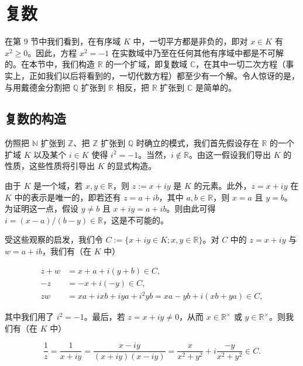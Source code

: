 \section{复数}

在第 9 节中我们看到，在有序域 $K$ 中，一切平方都是非负的，即对 $x \in K$ 有 $x^2 \geq 0$。因此，方程 $x^2 = -1$ 在实数域中乃至在任何其他有序域中都是不可解的。在本节中，我们构造 $\mathbb{R}$ 的一个扩域，即复数域 $\mathbb{C}$，在其中一切二次方程（事实上，正如我们以后将看到的，一切代数方程）都至少有一个解。令人惊讶的是，与用戴德金分割把 $\mathbb{Q}$ 扩张到 $\mathbb{R}$ 相反，把 $\mathbb{R}$ 扩张到 $\mathbb{C}$ 是简单的。

\subsection*{复数的构造}

仿照把 $ \mathbb{N} $ 扩张到 $ \mathbb{Z} $、把 $ \mathbb{Z} $ 扩张到 $ \mathbb{Q} $ 时确立的模式，我们首先假设存在 $ \mathbb{R} $ 的一个扩域 $ K $ 以及某个 $ i \in K $ 使得 $ i^2 = -1 $。当然，$ i \notin \mathbb{R} $。由这一假设我们导出 $ K $ 的性质，这些性质将引导出 $ K $ 的显式构造。

由于 $K$ 是一个域，若 $x, y \in \mathbb{R}$，则 $z := x + iy$ 是 $K$ 的元素。此外，$z = x + iy$ 在 $K$ 中的表示是唯一的，即若还有 $z = a + ib$，其中 $a, b \in \mathbb{R}$，则 $x = a$ 且 $y = b$。为证明这一点，假设 $y \neq b$ 且 $x + iy = a + ib$。则由此可得 $i = (x - a)/(b - y) \in \mathbb{R}$，这是不可能的。

受这些观察的启发，我们令 $C := \{ x + iy \in K ; x, y \in \mathbb{R} \}$。对 $C$ 中的 $z = x + iy$ 与 $w = a + ib$，我们有（在 $K$ 中）

\begin{equation}
\begin{aligned}
z+w&=x+a+i(y+b)\in C,\\-z&=-x+i(-y)\in C,\\zw&=xa+ixb+iya+i^{2}yb=xa-yb+i(xb+ya)\in C,
\end{aligned}
\end{equation}

其中我们用了 $ i^2 = -1 $。最后，若 $ z = x + iy \neq 0 $，从而 $ x \in \mathbb{R}^\times $ 或 $ y \in \mathbb{R}^\times $。则我们有（在 $ K $ 中）

\begin{equation}
\frac{1}{z}=\frac{1}{x+iy}=\frac{x-iy}{(x+iy)(x-iy)}=\frac{x}{x^{2}+y^{2}}+i\frac{-y}{x^{2}+y^{2}}\in C.
\end{equation}

